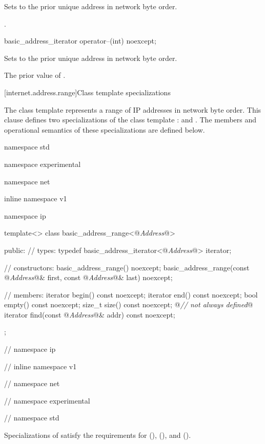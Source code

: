 \begin{itemdescr}
\pnum
\effects Sets  to the prior unique address in network byte order.

\pnum
\returns {}.
\end{itemdescr}

\begin{itemdecl}
basic_address_iterator operator--(int) noexcept;
\end{itemdecl}

\begin{itemdescr}
\pnum
\effects Sets  to the prior unique address in network byte order.

\pnum
\returns The prior value of .
\end{itemdescr}



[internet.address.range]{Class template  specializations}

\pnum
The class template  represents a range of IP addresses in network byte order. This clause defines two specializations of the class template :  and . The members and operational semantics of these specializations are defined below.

\begin{codeblock}
namespace std {
namespace experimental {
namespace net {
inline namespace v1 {
namespace ip {

  template<> class basic_address_range<@\textit{Address}@>
  {
  public:
    // types:
    typedef basic_address_iterator<@\textit{Address}@> iterator;

    // constructors:
    basic_address_range() noexcept;
    basic_address_range(const @\textit{Address}@& first,
                        const @\textit{Address}@& last) noexcept;

    // members:
    iterator begin() const noexcept;
    iterator end() const noexcept;
    bool empty() const noexcept;
    size_t size() const noexcept; @\textit{// not always defined}@
    iterator find(const @\textit{Address}@& addr) const noexcept;
  };

} // namespace ip
} // inline namespace v1
} // namespace net
} // namespace experimental
} // namespace std
\end{codeblock}

\pnum
Specializations of  satisfy the requirements for  (),  (), and  ().

